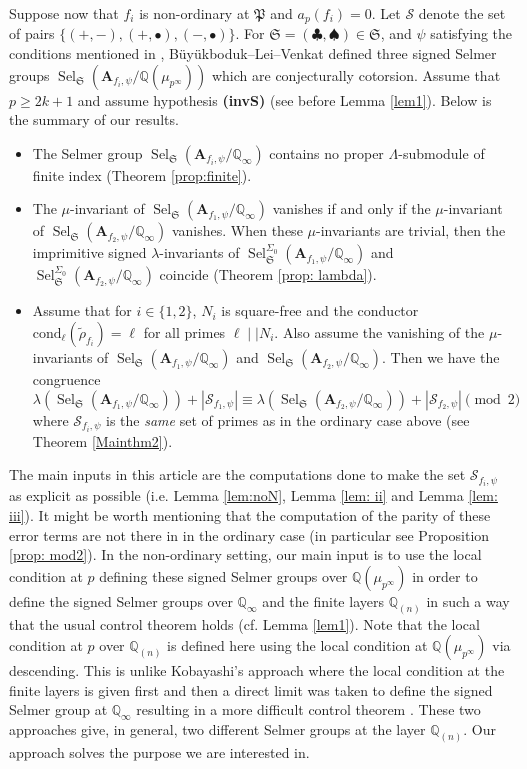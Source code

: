 \documentclass{amsart}
\renewcommand{\geq}{\geqslant}
\newcommand{\Q}{\mathbb{Q}}
\newcommand{\fS}{\mathfrak{S}}
\newcommand{\bA}{\mathbf{A}}
\newcommand{\Sel}{\operatorname{Sel}}
\newtheorem{auxiliary proposition}[theorem]{Auxiliary Proposition}
\newtheorem{main conjecture}[theorem]{Main Conjecture}
\newtheorem{main theorem}[theorem]{Main Theorem}
\newtheorem{modesty proposition}[theorem]{Modesty Proposition}
\newtheorem{open problem}[theorem]{Open Problem}
\newtheorem{convergence lemma}[theorem]{Convergence Lemma}
\newtheorem{corrected lemma}[theorem]{Corrected Lemma}
\newtheorem{growth lemma}[theorem]{Growth Lemma}
\newtheorem{coefficient lemma}[theorem]{Integrality Lemma}
\newtheorem{interpolation lemma}[theorem]{Interpolation Lemma}
\newtheorem{kernel lemma}[theorem]{Kernel Lemma}
\newtheorem{limit lemma}[theorem]{Limit Lemma}
\newtheorem{tandem lemma}[theorem]{Modesty Lemma}
\newtheorem{zero-finding lemma}[theorem]{Zero-Finding Lemma}
\begin{document}
Suppose now that $f_i$ is non-ordinary at $\mathfrak{P}$ and $a_p(f_i)=0$.  Let $\mathcal{S}$ denote the set of pairs $\{(+,-),(+,\bullet), (-,\bullet)\}.$ For $\fS = (\clubsuit, \spadesuit) \in \fS$, and $\psi$ satisfying the conditions mentioned in \cite[page 3]{BLV}, Büyükboduk--Lei--Venkat defined three signed Selmer groups $\Sel_{\fS}(\bA_{f_i, \psi}/\Q(\mu_{p^\infty}))$ which are conjecturally cotorsion.  Assume that $p\geq 2k+1$ and assume hypothesis \textbf{(invS)} (see before Lemma \ref{lem1}).  Below is the summary of our results.
\begin{itemize}
    \item  The Selmer group $\Sel_{\fS}(\bA_{f_i, \psi}/\Q_\infty)$ contains no proper $\Lambda$-submodule of finite index (Theorem \ref{prop:finite}).
    \item The $\mu$-invariant of $\Sel_{\fS}(\bA_{f_1, \psi}/\Q_\infty)$ vanishes if and only if the $\mu$-invariant of $\Sel_{\fS}(\bA_{f_2, \psi}/\Q_\infty)$ vanishes. When these $\mu$-invariants are trivial, then the imprimitive signed $\lambda$-invariants of $\Sel^{\Sigma_0}_{\fS}(\bA_{f_1, \psi}/\Q_\infty)$ and $\Sel^{\Sigma_0}_{\fS}(\bA_{f_2, \psi}/\Q_\infty)$ coincide
(Theorem \ref{prop: lambda}).
\item  Assume that for $i\in \{1,2\}$, $N_i$ is square-free and the conductor $\mathrm{cond}_\ell(\tilde{\rho}_{f_i})=\ell$ for all primes $\ell \mid \mid N_i$. Also assume the vanishing of the $\mu$-invariants of $\Sel_{\fS}(\bA_{f_1, \psi}/\Q_\infty)$ and $\Sel_{\fS}(\bA_{f_2, \psi}/\Q_\infty)$. Then we have the congruence
    $$\lambda(\Sel_{\fS}(\bA_{f_1, \psi}/\Q_\infty)) +|\mathcal{S}_{f_1,\psi}|\equiv \lambda(\Sel_{\fS}(\bA_{f_2, \psi}/\Q_\infty))+|\mathcal{S}_{f_2,\psi}| \pmod{2}$$
    where $\mathcal{S}_{f_i,\psi}$ is the \textit{same} set of primes as in the ordinary case above (see Theorem \ref{Mainthm2}).
\end{itemize}
The main inputs in this article are the computations done to make the set $\mathcal{S}_{f_i,\psi}$ as explicit as possible (i.e. Lemma \ref{lem:noN}, Lemma \ref{lem: ii} and Lemma \ref{lem: iii}). It might be worth mentioning that the computation of the parity of these error terms are not there in \cite{RaySujathaVatsal} in the ordinary case (in particular see Proposition \ref{prop: mod2}). In the non-ordinary setting, our main input is to use the local condition at $p$ defining these signed Selmer groups over $\Q(\mu_{p^\infty})$ in order to define the signed Selmer groups over $\Q_\infty$ and the finite layers $\Q_{(n)}$ in such a way that the usual control theorem holds (cf. Lemma \ref{lem1}). Note that the local condition at $p$ over $\Q_{(n)}$ is defined here using the local condition at $\Q(\mu_{p^\infty})$ via descending. This is unlike Kobayashi's approach \cite{kobayashi03} where the local condition at the finite layers is given first and then a direct limit was taken to define the signed Selmer group at $\Q_\infty$ resulting in a more difficult control theorem \cite[Theorem 9.3]{kobayashi03}. These two approaches give, in general, two different Selmer groups at the layer $\Q_{(n)}$. Our approach solves the purpose we are interested in.
\end{document}
